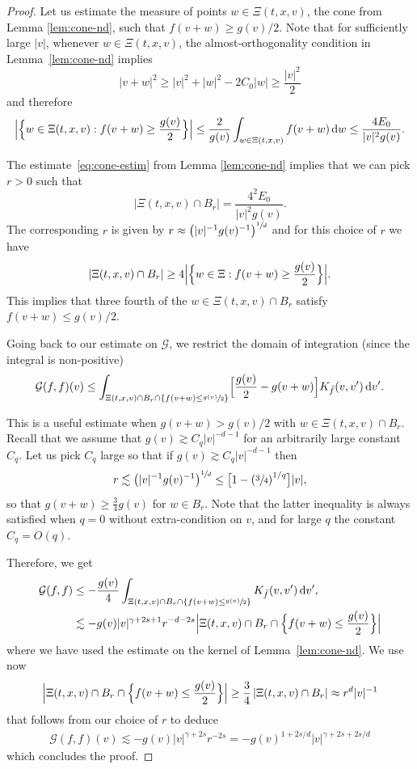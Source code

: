 \documentclass[JEP,XML,SOM,Unicode,NoFloatCountersInSection]{cedram}
\theoremstyle{plain}
\theoremstyle{definition}
\numberwithin{equation}{section}
\newcommand{\dd} {\, \mathrm{d}}
\begin{document}
\begin{proof}
Let us estimate the measure of points $w \in \Xi(t,x,v)$, the cone
from Lemma \ref{lem:cone-nd}, such that $f(v+w) \ge g(v)/2$. Note that
for sufficiently large $|v|$, whenever $w \in \Xi(t,x,v)$, the
almost-orthogonality condition in Lemma~\ref{lem:cone-nd} implies
\[
|v+w|^2 \geq |v|^2 + |w|^2 - 2 C_0|w| \geq \frac{|v|^2}{2}
\]
and therefore
\[
\Bigl|\Bigl\{ w \in \Xi(t,x,v) : f(v+w) \ge \frac{g(v)}{2} \Bigr\}\Bigr|
\le \frac2{g(v)} \int_{w \in \Xi(t,x,v)} f(v+w) \dd w \le \frac{4E_0}{|v|^2
g(v)}.
\]

The estimate~\eqref{eq:cone-estim} from Lemma \ref{lem:cone-nd}
implies that we can pick $r>0$ such that
\[
\left|\Xi(t,x,v) \cap B_r \right| = \frac{4^2E_0}{|v|^2 g(v)}.
\]
The corresponding $r$ is given by
$r \approx \left(|v|^{-1} g(v)^{-1}\right)^{\sfrac1d}$ and for this
choice of $r$ we have
\[
\left|\Xi(t,x,v) \cap B_r \right| \ge 4 \Bigl|\Bigl\{ w \in \Xi: f(v+w)
\ge \frac{g(v)}{2} \Bigr\}\Bigr|.
\]
This implies that three fourth of the $w \in \Xi(t,x,v) \cap B_r$ satisfy
$f(v+w) \le g(v)/2$.

Going back to our estimate on $\mathcal G$, we restrict the domain of
integration (since the integral is non-positive)
\[
\mathcal G(f,f)(v) \leq \int_{\Xi(t,x,v) \cap B_r \cap \left\{f(v+w) \le \sfrac{g(v)}{2}\right\}}
\Bigl[ \frac{g(v)}{2} - g(v+w) \Bigr] K_{\bar f}(v,v') \dd v'.
\]

This is a useful estimate when $g(v+w) > g(v)/2$ with
$w \in \Xi(t,x,v) \cap B_r$. Recall that we assume that
$g(v) \gtrsim C_q |v|^{-d-1}$ for an arbitrarily large constant
$C_q$. Let us pick $C_q$ large so that if
$g(v) \gtrsim C_q |v|^{-d-1}$ then
\[
r \lesssim \left(|v|^{-1} g(v)^{-1}\right)^{\sfrac1d} \leq \bigl[ 1-
\left( \sfrac{3}{4} \right)^{1/q} \bigr] |v|,
\]
so that $g(v+w) \geq \frac{3}{4} g(v)$ for $w \in B_r$. Note that the
latter inequality is always satisfied when $q=0$ without
extra-condition on $v$, and for large $q$ the constant $C_q=O(q)$.

Therefore, we get
\begin{align*}
\mathcal G(f,f)
&\leq -\frac{g(v)} 4 \int_{\Xi(t,x,v) \cap B_r \cap \left\{f(v+w) \le \sfrac{g(v)}{2}\right\}} K_{\bar f}(v,v') \dd v', \\
&\lesssim -g(v) |v|^{\gamma+2s+1} r^{-d-2s} \Bigl|\Xi(t,x,v) \cap B_r \cap
\Bigl\{f(v+w) \le \frac{g(v)}{2}\Bigr\}\Bigr|
\end{align*}
where we have used the estimate on the kernel of
Lemma~\ref{lem:cone-nd}. We use now
\[
\Bigl|\Xi(t,x,v) \cap B_r \cap \Bigl\{f(v+w) \le \frac{g(v)}{2} \Bigr\}\Bigr| \ge \frac34\, |\Xi(t,x,v) \cap
B_r| \approx r^d |v|^{-1}
\]
that follows from our choice of $r$ to deduce
\begin{align*}
\mathcal G(f,f)(v) \lesssim -g(v) |v|^{\gamma+2s} r^{-2s} =
- g(v)^{1+2s/d} |v|^{\gamma+2s+2s/d}
\end{align*}
which concludes the proof.
\end{proof}
\end{document}
